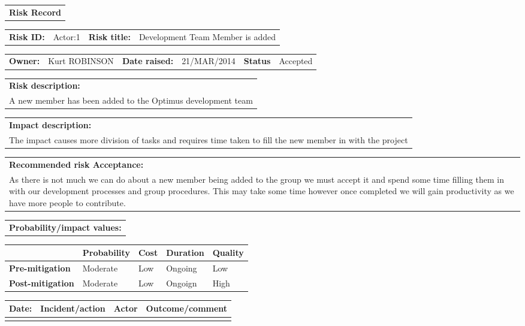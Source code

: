 \begin{table}
	\begin{tabularx}{\textwidth}{| X |}
		\hline
		\textbf{Risk Record} \\
	\end{tabularx}
	\begin{tabularx}{\textwidth}{| l | X | l | X |}
		\hline
		\textbf{Risk ID:} & Actor:1 & \textbf{Risk title:} & Development Team Member is added \\
	\end{tabularx}
	\begin{tabularx}{\textwidth}{| l | X | l | X | l | X |}
		\hline
		\textbf{Owner:} & Kurt ROBINSON & \textbf{Date raised:} & 21/MAR/2014 & \textbf{Status} & Accepted \\
	\end{tabularx}
	\begin{tabularx}{\textwidth}{| X |}
		\hline
		\textbf{Risk description:} \\ A new member has been added to the Optimus development team \\
	\end{tabularx}
	\begin{tabularx}{\textwidth}{| X |}
		\hline
		\textbf{Impact description:} \\ The impact causes more division of tasks and requires time taken to fill the new member in with the project \\
	\end{tabularx}
	\begin{tabularx}{\textwidth}{| X |}
		\hline
		\textbf{Recommended risk Acceptance:} \\ As there is not much we can do about a new member being added to the group we must accept it and spend some time filling them in with our development processes and group procedures. This may take some time however once completed we will gain productivity as we have more people to contribute. \\
	\end{tabularx}
	\begin{tabularx}{\textwidth}{| X |}
		\hline
		\textbf{Probability/impact values:} \\
	\end{tabularx}
	\begin{tabularx}{\textwidth}{| l | l | X | X | X |}
		\hline
		 &  \textbf{Probability} & \textbf{Cost} & \textbf{Duration} & \textbf{Quality} \\ \hline
		\textbf{Pre-mitigation} & Moderate & Low & Ongoing & Low\\ \hline
		\textbf{Post-mitigation} & Moderate & Low & Ongoign & High \\ \hline \hline
	\end{tabularx}
	\begin{tabularx}{\textwidth}{| l | X | l | X |}
		\hline
		\textbf{Date:} & \textbf{Incident/action} & \textbf{Actor} & \textbf{Outcome/comment} \\ \hline
		 & &  &  \\ \hline
	\end{tabularx}
\end{table}

